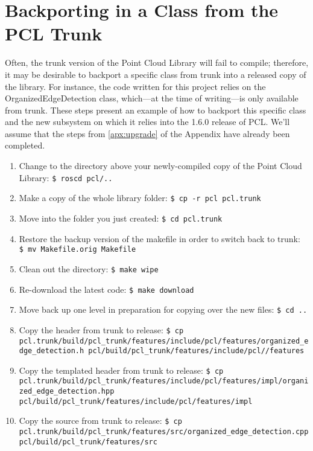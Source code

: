 \documentclass[12pt]{report}
\begin{document}
\section{Backporting in a Class from the PCL Trunk}
Often, the trunk version of the Point Cloud Library will fail to compile; therefore, it may be desirable to backport a specific class from trunk into a released copy of the library.  For instance, the code written for this project relies on the OrganizedEdgeDetection class, which---at the time of writing---is only available from trunk.  These steps present an example of how to backport this specific class and the new subsystem on which it relies into the 1.6.0 release of PCL.  We'll assume that the steps from \autoref{apx:upgrade} of the Appendix have already been completed.
\begin{sloppypar}
\begin{enumerate}
\item{Change to the directory above your newly-compiled copy of the Point Cloud Library: \texttt{\$\ roscd pcl/..}}
\item{Make a copy of the whole library folder: \texttt{\$\ cp -r pcl pcl.trunk}}
\item{Move into the folder you just created: \texttt{\$\ cd pcl.trunk}}
\item{Restore the backup version of the makefile in order to switch back to trunk: \texttt{\$\ mv Makefile.orig Makefile}}
\item{Clean out the directory: \texttt{\$\ make wipe}}
\item{Re-download the latest code: \texttt{\$\ make download}}
\item{Move back up one level in preparation for copying over the new files: \texttt{\$\ cd ..}}
\item{Copy the header from trunk to release: \texttt{\$\ cp pcl.trunk\slash build\slash pcl\_trunk\slash features\slash include\slash pcl\slash features\slash organized\_edge\_detection.h pcl\slash build\slash pcl\_trunk\slash features\slash include\slash pcl\slash\slash features}}
\item{Copy the templated header from trunk to release: \texttt{\$\ cp pcl.trunk\slash build\slash pcl\_trunk\slash features\slash include\slash pcl\slash features\slash impl\slash organized\_edge\_detection.hpp pcl\slash build\slash pcl\_trunk\slash features\slash include\slash pcl\slash features\slash impl}}
\item{Copy the source from trunk to release: \texttt{\$\ cp pcl.trunk\slash build\slash pcl\_trunk\slash features\slash src\slash organized\_edge\_detection.cpp pcl\slash build\slash pcl\_trunk\slash features\slash src}}

\end{enumerate}
\end{sloppypar}
\end{document}
